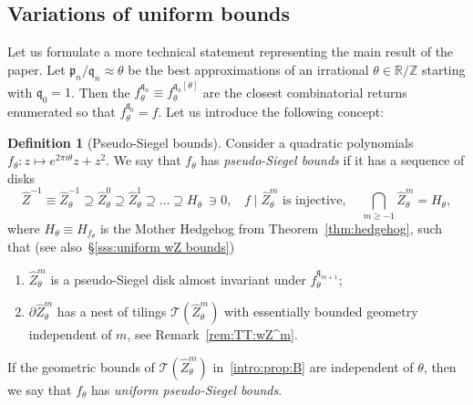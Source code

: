 \documentclass{amsart}
\renewcommand{\sp}{{\ \ }}
\newcommand{\1}{{\mathbb 1 }}
\newcommand\TT{\mathcal{T}}
\newcommand{\wZ}{{\widehat Z}}
\newcommand{\pp}{\mathfrak{p}}
\newcommand{\qq}{\mathfrak{q}}
\newcommand{\R}{\mathbb{R}}
\newcommand{\Z}{\mathbb{Z}}
\theoremstyle{remark}
\numberwithin{equation}{section}
\theoremstyle{definition}
\newtheorem{defn}[thm]{Definition}
\begin{document}













\subsection{Variations of uniform bounds} \label{ss:pseudo-Siegel bounds}  Let us formulate  a more technical statement representing the main result of the paper. Let $\pp_n/\qq_n\approx \theta$ be the best approximations of an irrational $\theta\in \R/\Z$ starting with $\qq_0=1$. Then the $f_\theta^{\qq_n}\equiv f_\theta^{\qq_n[\theta]}$ are the closest combinatorial returns enumerated so that $f_\theta^{\qq_0}=f$. Let us introduce the following concept:

\begin{defn}[Pseudo-Siegel bounds] \label{defn:ps Siegel bounds}Consider a quadratic polynomials $f_\theta\colon z\mapsto e^{2\pi i \theta} z + z^2$. We say that $f_\theta$ has \emph{pseudo-Siegel bounds} if it has a sequence of disks  
\begin{equation}
\label{eq:dfn:wZ^m:intro}
\wZ^{-1}\equiv \wZ^{-1}_\theta\supseteq \wZ^{0}_\theta\supseteq \wZ^1_\theta\supseteq \dots \supseteq H_{\theta}\ \ni 0, \sp\sp f\mid \wZ^m_\theta \text{ is injective, }\sp\sp \bigcap_{m\ge -1} \wZ^m_\theta =H_{\theta},
\end{equation}
where $H_{\theta}\equiv H_{f_\theta}$ is the Mother Hedgehog from Theorem~\ref{thm:hedgehog}, such that (see also~\S\ref{sss:uniform wZ bounds})
\begin{enumerate}[label=\text{(\Alph*)},font=\normalfont,leftmargin=*]
\item\label{intro:prop:A} $\wZ^{m}_\theta$ is a pseudo-Siegel disk almost invariant under $f_\theta^{\qq_{m+1}}$;
\item\label{intro:prop:B} $\partial \wZ^m_\theta$ has a nest of tilings $\TT\left(\wZ^m_\theta\right)$ with essentially bounded geometry independent of $m$, see Remark~\ref{rem:TT:wZ^m}. 
\end{enumerate}
If the geometric bounds of $\TT\left(\wZ^m_\theta\right)$ in~\ref{intro:prop:B} are independent of $\theta$, then we say that $f_\theta$ has \emph{uniform pseudo-Siegel bounds}.
\end{defn}
\end{document}
